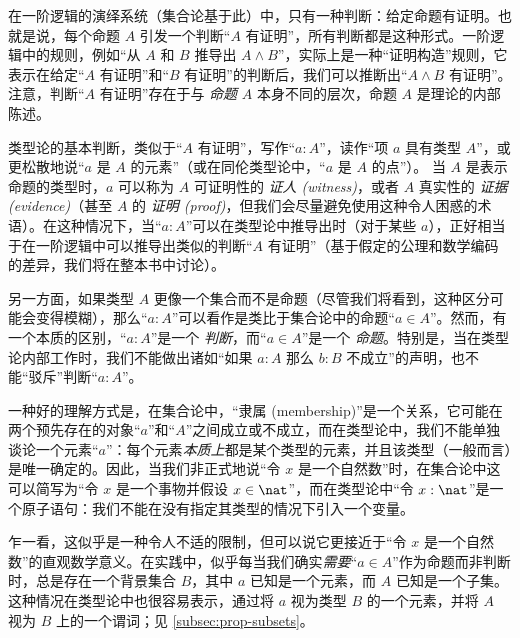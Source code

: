 在一阶逻辑的演绎系统（集合论基于此）中，只有一种判断：给定命题有证明。也就是说，每个命题 $A$ 引发一个判断“$A$ 有证明”，所有判断都是这种形式。一阶逻辑中的规则，例如“从 $A$ 和 $B$ 推导出 $A\wedge B$”，实际上是一种“证明构造”规则，它表示在给定“$A$ 有证明”和“$B$ 有证明”的判断后，我们可以推断出“$A\wedge B$ 有证明”。注意，判断“$A$ 有证明”存在于与 \emph{命题} $A$ 本身不同的层次，命题 $A$ 是理论的内部陈述。

类型论的基本判断，类似于“$A$ 有证明”，写作“$a:A$”，读作“项 $a$ 具有类型 $A$”，或更松散地说“$a$ 是 $A$ 的元素”（或在同伦类型论中，“$a$ 是 $A$ 的点”）。
%
%
%
当 $A$ 是表示命题的类型时，$a$ 可以称为 $A$ 可证明性的 \emph{证人 (witness)}，或者 $A$ 真实性的 \emph{证据 (evidence)}（甚至 $A$ 的 \emph{证明 (proof)}，但我们会尽量避免使用这种令人困惑的术语）。在这种情况下，当“$a:A$”可以在类型论中推导出时（对于某些 $a$），正好相当于在一阶逻辑中可以推导出类似的判断“$A$ 有证明”（基于假定的公理和数学编码的差异，我们将在整本书中讨论）。

另一方面，如果类型 $A$ 更像一个集合而不是命题（尽管我们将看到，这种区分可能会变得模糊），那么“$a:A$”可以看作是类比于集合论中的命题“$a\in A$”。然而，有一个本质的区别，“$a:A$”是一个 \emph{判断}，而“$a\in A$”是一个 \emph{命题}。特别是，当在类型论内部工作时，我们不能做出诸如“如果 $a:A$ 那么 $b:B$ 不成立”的声明，也不能“驳斥”判断“$a:A$”。

一种好的理解方式是，在集合论中，“隶属 (membership)”是一个关系，它可能在两个预先存在的对象“$a$”和“$A$”之间成立或不成立，而在类型论中，我们不能单独谈论一个元素“$a$”：每个元素\emph{本质上}都是某个类型的元素，并且该类型（一般而言）是唯一确定的。因此，当我们非正式地说“令 $x$ 是一个自然数”时，在集合论中这可以简写为“令 $x$ 是一个事物并假设 $x\in\nat$”，而在类型论中“令 $x:\nat$”是一个原子语句：我们不能在没有指定其类型的情况下引入一个变量。

乍一看，这似乎是一种令人不适的限制，但可以说它更接近于“令 $x$ 是一个自然数”的直观数学意义。在实践中，似乎每当我们确实\emph{需要}“$a\in A$”作为命题而非判断时，总是存在一个背景集合 $B$，其中 $a$ 已知是一个元素，而 $A$ 已知是一个子集。这种情况在类型论中也很容易表示，通过将 $a$ 视为类型 $B$ 的一个元素，并将 $A$ 视为 $B$ 上的一个谓词；见 \cref{subsec:prop-subsets}。

